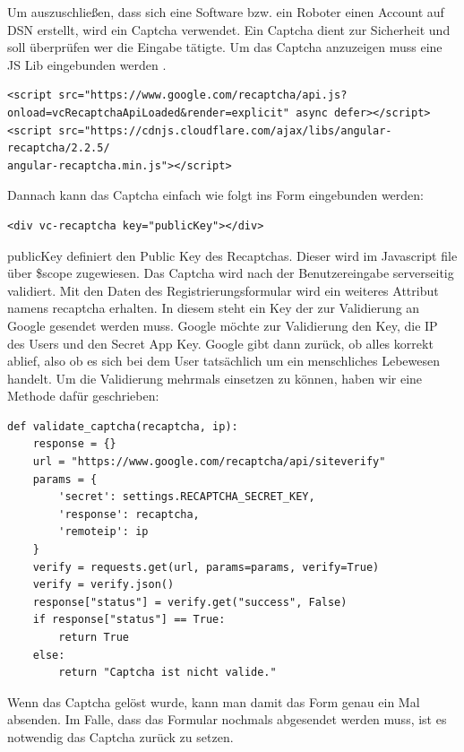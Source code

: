 Um auszuschließen, dass sich eine Software bzw. ein Roboter einen Account auf DSN erstellt, wird ein Captcha verwendet. Ein Captcha dient zur Sicherheit und soll überprüfen wer die Eingabe tätigte.
Um das Captcha anzuzeigen muss eine JS Lib eingebunden werden \cite{CAPTCHA}.
\begin{lstlisting}
<script src="https://www.google.com/recaptcha/api.js?
onload=vcRecaptchaApiLoaded&render=explicit" async defer></script>
<script src="https://cdnjs.cloudflare.com/ajax/libs/angular-recaptcha/2.2.5/
angular-recaptcha.min.js"></script>
\end{lstlisting}

Dannach kann das Captcha einfach wie folgt ins Form eingebunden werden:
\begin{lstlisting}
<div vc-recaptcha key="publicKey"></div>
\end{lstlisting}

publicKey definiert den Public Key des Recaptchas. Dieser wird im Javascript file über \$scope zugewiesen.
Das Captcha wird nach der Benutzereingabe serverseitig validiert. Mit den Daten des Registrierungsformular wird ein weiteres Attribut namens recaptcha erhalten. In diesem steht ein Key der zur Validierung an Google gesendet werden muss. Google möchte zur Validierung den Key, die IP des Users und den Secret App Key. Google gibt dann zurück, ob alles korrekt ablief, also ob es sich bei dem User tatsächlich um ein menschliches Lebewesen handelt. Um die Validierung mehrmals einsetzen zu können, haben wir eine Methode dafür geschrieben:

\begin{lstlisting}
def validate_captcha(recaptcha, ip):
    response = {}
    url = "https://www.google.com/recaptcha/api/siteverify"
    params = {
        'secret': settings.RECAPTCHA_SECRET_KEY,
        'response': recaptcha,
        'remoteip': ip
    }
    verify = requests.get(url, params=params, verify=True)
    verify = verify.json()
    response["status"] = verify.get("success", False)
    if response["status"] == True:
        return True
    else:
        return "Captcha ist nicht valide." 
\end{lstlisting}


Wenn das Captcha gelöst wurde, kann man damit das Form genau ein Mal absenden. Im Falle, dass das Formular nochmals abgesendet werden muss, ist es notwendig das Captcha zurück zu setzen.


